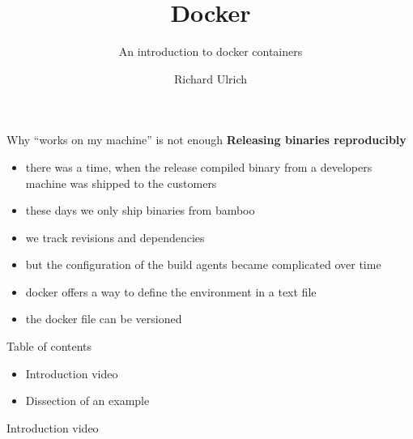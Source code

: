 \documentclass[11pt]{beamer}
\author{Richard Ulrich}
\title{Docker}
\subtitle{An introduction to docker containers}
\institute{BORM Informatik AG}
\begin{document}
\begin{frame}
\titlepage
\end{frame}

\begin{frame}{Why ``works on my machine'' is not enough}
\textbf{Releasing binaries reproducibly}
\begin{itemize}
\item there was a time, when the release compiled binary from a developers machine was shipped to the customers
\item these days we only ship binaries from bamboo
\item we track revisions and dependencies
\item but the configuration of the build agents became complicated over time
\item docker offers a way to define the environment in a text file
\item the docker file can be versioned
\end{itemize}
\end{frame}

\begin{frame}{Table of contents}
\begin{itemize}
\item Introduction video
\item Dissection of an example
\end{itemize}
\end{frame}

\begin{frame}{Introduction video}
\centering
{}
\end{frame}
\end{document}
